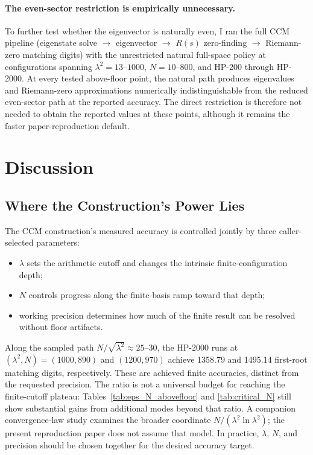 \documentclass[11pt,a4paper]{article}
\begin{document}
\paragraph{The even-sector restriction is empirically unnecessary.}
To further test whether the eigenvector is naturally even, I ran
the full CCM pipeline (eigenstate solve $\to$ eigenvector $\to$
$R(s)$ zero-finding $\to$ Riemann-zero matching digits) with the
unrestricted natural full-space policy at configurations spanning
$\lambda^2 = 13$--$1000$, $N = 10$--$800$, and HP-200 through
HP-2000. At every tested above-floor point, the natural path produces
eigenvalues and Riemann-zero approximations numerically
indistinguishable from the reduced even-sector path at the reported
accuracy. The direct restriction is therefore not needed to obtain
the reported values at these points, although it remains the faster
paper-reproduction default.

\section{Discussion}

\subsection{Where the Construction's Power Lies}

The CCM construction's measured accuracy is controlled jointly by
three caller-selected parameters:
\begin{itemize}
\item $\lambda$ sets the arithmetic cutoff and changes the intrinsic
finite-configuration depth;
\item $N$ controls progress along the finite-basis ramp toward that
depth;
\item working precision determines how much of the finite result can be
resolved without floor artifacts.
\end{itemize}

Along the sampled path $N/\sqrt{\lambda^2}\approx25$--$30$, the
HP-2000 runs at $(\lambda^2,N)=(1000,890)$ and $(1200,970)$ achieve
1358.79 and 1495.14 first-root matching digits, respectively. These
are achieved finite accuracies, distinct from the requested precision.
The ratio is not a universal budget for reaching the finite-cutoff plateau: Tables~\ref{tab:eps_N_abovefloor} and
\ref{tab:critical_N} still show substantial gains from additional
modes beyond that ratio. A companion convergence-law study
\cite{Andrews2026ConvergenceLaw} examines the broader coordinate
$N/(\lambda^2\ln\lambda^2)$; the present reproduction paper does not
assume that model. In practice, $\lambda$, $N$, and precision should be
chosen together for the desired accuracy target.
\end{document}
